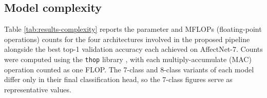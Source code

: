 \begin{table}[h!]
    \centering
    \footnotesize
    \smallskip
    \caption[Macro-averaged validation metrics by pipeline stage]{Macro-averaged precision, recall, and F1 score with the corresponding top-1 validation accuracy (\%) for the five pipeline stages of table \ref{tab:results-progression} on both AffectNet subsets. Macro averages weight every class equally regardless of its sample count.}
    \label{tab:results-macro}
\end{table}

\subsection{Model complexity}
\label{section:results-metrics-complexity}

Table \ref{tab:results-complexity} reports the parameter and MFLOPs (floating-point operations) counts for the four architectures involved in the proposed pipeline alongside the best top-1 validation accuracy each achieved on AffectNet-7. Counts were computed using the \texttt{thop} library \cite{lyken17_thop}, with each multiply-accumulate (MAC) operation counted as one FLOP. The 7-class and 8-class variants of each model differ only in their final classification head, so the 7-class figures serve as representative values.\\

